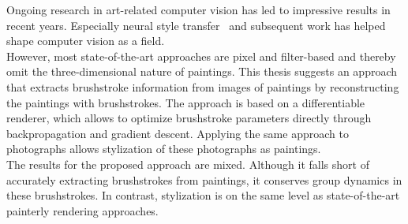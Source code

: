 Ongoing research in art-related computer vision has led to impressive results in recent years.
Especially neural style transfer~\cite{gatys} and subsequent work has helped shape computer vision as a field.\\
However, most state-of-the-art approaches are pixel and filter-based and thereby omit the three-dimensional nature of paintings.
This thesis suggests an approach that extracts brushstroke information from images of paintings by reconstructing the paintings with brushstrokes.
The approach is based on a differentiable renderer, which allows to optimize brushstroke parameters directly through backpropagation and gradient descent.
Applying the same approach to photographs allows stylization of these photographs as paintings.\\
The results for the proposed approach are mixed.
Although it falls short of accurately extracting brushstrokes from paintings, it conserves group dynamics in these brushstrokes.
In contrast, stylization is on the same level as state-of-the-art painterly rendering approaches.
